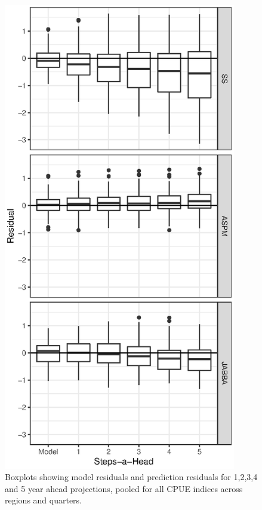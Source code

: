 \documentclass[12pt,halfline,a4paper,nonumbib]{ouparticle}
\begin{document}
\begin{figure}[htbp]
\centering
\includegraphics[width=4in]{fig6.eps}
\caption{Boxplots showing model residuals and prediction residuals for 1,2,3,4 and 5 year ahead projections, pooled for all CPUE indices across regions and quarters.}
\label{fig:residuals}
\end{figure}


%
\end{document}
